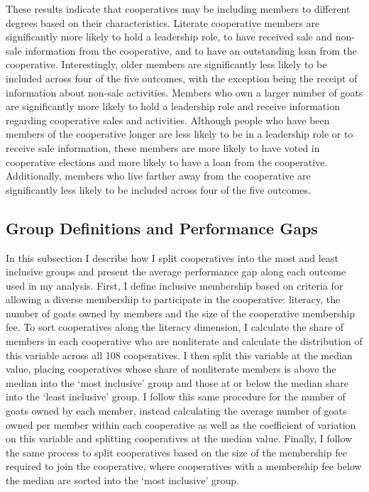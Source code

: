 \documentclass[11pt]{article}
\begin{document}
These results indicate that cooperatives may be including members to different degrees based on their characteristics. Literate cooperative members are significantly more likely to hold a leadership role, to have received sale and non-sale information from the cooperative, and to have an outstanding loan from the cooperative. Interestingly, older members are significantly less likely to be included across four of the five outcomes, with the exception being the receipt of information about non-sale activities. Members who own a larger number of goats are significantly more likely to hold a leadership role and receive information regarding cooperative sales and activities. Although people who have been members of the cooperative longer are less likely to be in a leadership role or to receive sale information, these members are more likely to have voted in cooperative elections and more likely to have a loan from the cooperative. Additionally, members who live farther away from the cooperative are significantly less likely to be included across four of the five outcomes.  


\subsection{Group Definitions and Performance Gaps}

In this subsection I describe how I split cooperatives into the most and least inclusive groups and present the average performance gap along each outcome used in my analysis. First, I define inclusive membership based on criteria for allowing a diverse membership to participate in the cooperative: literacy, the number of goats owned by members and the size of the cooperative membership fee. To sort cooperatives along the literacy dimension, I calculate the share of members in each cooperative who are nonliterate and calculate the distribution of this variable across all 108 cooperatives. I then split this variable at the median value, placing cooperatives whose share of nonliterate members is above the median into the `most inclusive' group and those at or below the median share into the `least inclusive' group. I follow this same procedure for the number of goats owned by each member, instead calculating the average number of goats owned per member within each cooperative as well as the coefficient of variation on this variable and splitting cooperatives at the median value. Finally, I follow the same process to split cooperatives based on the size of the membership fee required to join the cooperative, where cooperatives with a membership fee below the median are sorted into the `most inclusive' group. 
\end{document}
